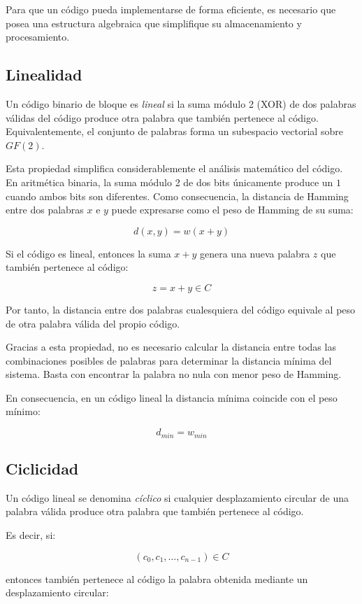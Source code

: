 Para que un código pueda implementarse de forma eficiente, es necesario que posea una estructura algebraica que simplifique su almacenamiento y procesamiento.

\subsection{Linealidad}

Un código binario de bloque es \textit{lineal} si la suma módulo 2 (XOR) de dos palabras válidas del código produce otra palabra que también pertenece al código. Equivalentemente, el conjunto de palabras forma un subespacio vectorial sobre $GF(2)$.

Esta propiedad simplifica considerablemente el análisis matemático del código. En aritmética binaria, la suma módulo 2 de dos bits únicamente produce un $1$ cuando ambos bits son diferentes. Como consecuencia, la distancia de Hamming entre dos palabras $x$ e $y$ puede expresarse como el peso de Hamming de su suma:

$$
d(x,y)=w(x+y)
$$

Si el código es lineal, entonces la suma $x+y$ genera una nueva palabra $z$ que también pertenece al código:

$$
z=x+y \in C
$$

Por tanto, la distancia entre dos palabras cualesquiera del código equivale al peso de otra palabra válida del propio código.

Gracias a esta propiedad, no es necesario calcular la distancia entre todas las combinaciones posibles de palabras para determinar la distancia mínima del sistema. Basta con encontrar la palabra no nula con menor peso de Hamming.

En consecuencia, en un código lineal la distancia mínima coincide con el peso mínimo:

$$
d_{min}=w_{min}
$$

\subsection{Ciclicidad}

Un código lineal se denomina \textit{cíclico} si cualquier desplazamiento circular de una palabra válida produce otra palabra que también pertenece al código.

Es decir, si:

$$
(c_0,c_1,\dots,c_{n-1}) \in C
$$

entonces también pertenece al código la palabra obtenida mediante un desplazamiento circular:

